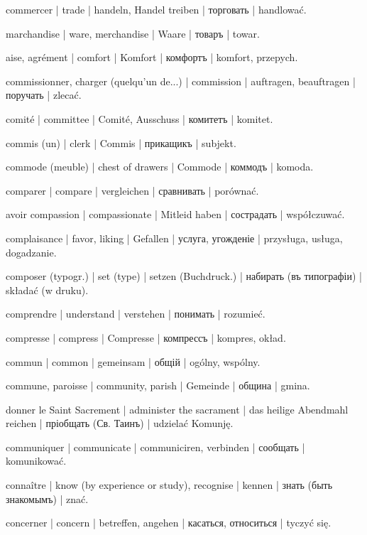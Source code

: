 \begin{outdent}{1em}
commercer | trade | handeln, Handel treiben | торговать | handlować.

\uvsubentry{}
marchandise | ware, merchandise | Waare | товаръ | towar.

aise, agrément | comfort | Komfort | комфортъ | komfort,
przepych.

commissionner, charger (quelqu’un de...) | commission | auftragen, beauftragen | поручать | zlecać.

comité | committee | Comité, Ausschuss | комитетъ | komitet.

commis (un) | clerk | Commis | прикащикъ | subjekt.

commode (meuble) | chest of drawers | Commode | коммодъ | komoda.

comparer | compare | vergleichen | сравнивать | porównać.

avoir compassion | compassionate | Mitleid haben | сострадать | współczuwać.

complaisance | favor, liking | Gefallen | услуга, угожденіе | przysługa, usługa, dogadzanie.

composer (typogr.) | set (type) | setzen (Buchdruck.) | набирать (въ типографіи) | składać (w druku).

comprendre | understand | verstehen | понимать | rozumieć.

compresse | compress | Compresse | компрессъ | kompres, okład.

commun | common | gemeinsam | общій | ogólny, wspólny.

\uvsubentry{}
commune, paroisse | community, parish | Gemeinde | община | gmina.

donner le Saint Sacrement | administer the sacrament | das heilige Abendmahl reichen | пріобщать (Св. Таинъ) | udzielać Komunję.

communiquer | communicate | communiciren, verbinden | сообщать | komunikować.

connaître | know (by experience or study), recognise | kennen | знать (быть знакомымъ) | znać.

concerner | concern | betreffen, angehen | касаться,
относиться | tyczyć się.


\end{outdent}
